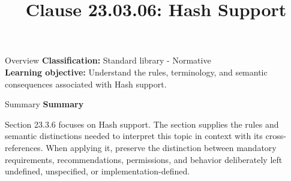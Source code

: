 \documentclass[10pt,letterpaper]{article}
\title{Clause 23.03.06: Hash Support}
\author{}
\date{}
\begin{document}
\maketitle
\begin{CornellOverviewBox}{Overview}
\textbf{Classification:} Standard library - Normative\\[2pt]
\textbf{Learning objective:} Understand the rules, terminology, and semantic consequences associated with Hash support.
\end{CornellOverviewBox}\begin{CornellSummaryBox}{Summary}
{\sffamily\bfseries\color{Accent} Summary}\par\vspace{3pt}Section 23.3.6 focuses on Hash support. The section supplies the rules and semantic distinctions needed to interpret this topic in context with its cross-references. When applying it, preserve the distinction between mandatory requirements, recommendations, permissions, and behavior deliberately left undefined, unspecified, or implementation-defined.
\end{CornellSummaryBox}
\end{document}
